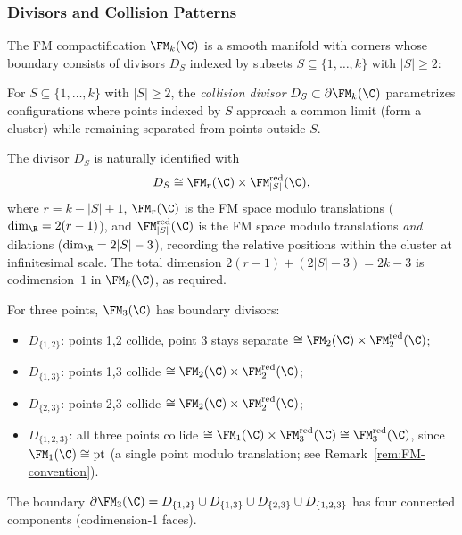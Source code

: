 \subsubsection{Divisors and Collision Patterns}

The FM compactification $\FM_k(\C)$ is a smooth manifold with corners whose boundary consists of divisors $D_S$ indexed by subsets $S \subseteq \{1,\ldots,k\}$ with $|S| \geq 2$:

\begin{definition}
\label{def:boundary_divisors}
For $S \subseteq \{1,\ldots,k\}$ with $|S| \geq 2$, the \emph{collision divisor} $D_S \subset \partial \FM_k(\C)$ parametrizes configurations where points indexed by $S$ approach a common limit (form a cluster) while remaining separated from points outside $S$.

The divisor $D_S$ is naturally identified with
\[
D_S \cong \FM_r(\C) \times \FM_{|S|}^{\mathrm{red}}(\C),
\]
where $r = k - |S| + 1$, $\FM_r(\C)$ is the FM space modulo translations ($\dim_\R = 2(r-1)$), and $\FM_{|S|}^{\mathrm{red}}(\C)$ is the FM space modulo translations \emph{and} dilations ($\dim_\R = 2|S| - 3$), recording the relative positions within the cluster at infinitesimal scale. The total dimension $2(r-1) + (2|S|-3) = 2k - 3$ is codimension~$1$ in $\FM_k(\C)$, as required.
\end{definition}

\begin{example}[$k=3$]
For three points, $\FM_3(\C)$ has boundary divisors:
\begin{itemize}
\item $D_{\{1,2\}}$: points 1,2 collide, point 3 stays separate $\cong \FM_2(\C) \times \FM_2^{\mathrm{red}}(\C)$;
\item $D_{\{1,3\}}$: points 1,3 collide $\cong \FM_2(\C) \times \FM_2^{\mathrm{red}}(\C)$;
\item $D_{\{2,3\}}$: points 2,3 collide $\cong \FM_2(\C) \times \FM_2^{\mathrm{red}}(\C)$;
\item $D_{\{1,2,3\}}$: all three points collide $\cong \FM_1(\C) \times \FM_3^{\mathrm{red}}(\C) \cong \FM_3^{\mathrm{red}}(\C)$, since $\FM_1(\C) \cong \mathrm{pt}$ (a single point modulo translation; see Remark~\ref{rem:FM-convention}).
\end{itemize}
The boundary $\partial \FM_3(\C) = D_{\{1,2\}} \cup D_{\{1,3\}} \cup D_{\{2,3\}} \cup D_{\{1,2,3\}}$ has four connected components (codimension-1 faces).
\end{example}

